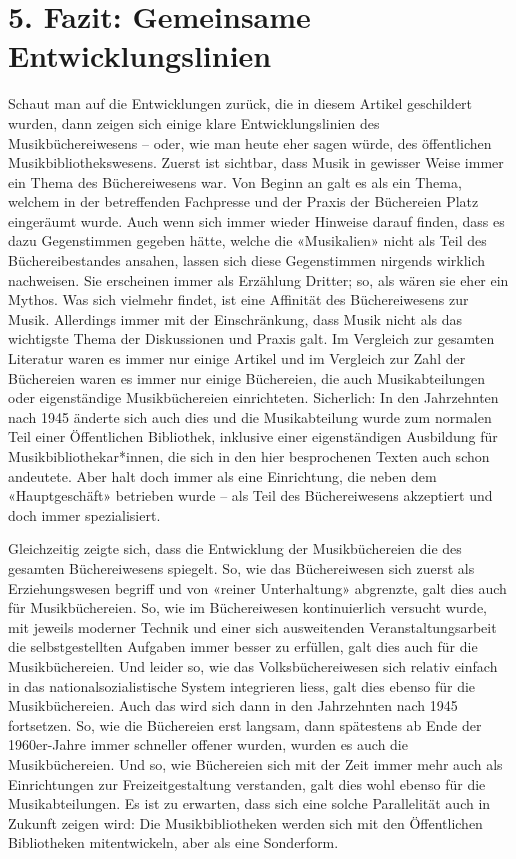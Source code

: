 \documentclass[a4paper,
fontsize=11pt,
oneside,
numbers=noperiodatend,
parskip=half-,
bibliography=totoc,
final
]{scrartcl}
\begin{document}
\hypertarget{fazit-gemeinsame-entwicklungslinien}{%
\section{5. Fazit: Gemeinsame
Entwicklungslinien}\label{fazit-gemeinsame-entwicklungslinien}}

Schaut man auf die Entwicklungen zurück, die in diesem Artikel
geschildert wurden, dann zeigen sich einige klare Entwicklungslinien des
Musikbüchereiwesens -- oder, wie man heute eher sagen würde, des
öffentlichen Musikbibliothekswesens. Zuerst ist sichtbar, dass Musik in
gewisser Weise immer ein Thema des Büchereiwesens war. Von Beginn an
galt es als ein Thema, welchem in der betreffenden Fachpresse und der
Praxis der Büchereien Platz eingeräumt wurde. Auch wenn sich immer
wieder Hinweise darauf finden, dass es dazu Gegenstimmen gegeben hätte,
welche die «Musikalien» nicht als Teil des Büchereibestandes ansahen,
lassen sich diese Gegenstimmen nirgends wirklich nachweisen. Sie
erscheinen immer als Erzählung Dritter; so, als wären sie eher ein
Mythos. Was sich vielmehr findet, ist eine Affinität des Büchereiwesens
zur Musik. Allerdings immer mit der Einschränkung, dass Musik nicht als
das wichtigste Thema der Diskussionen und Praxis galt. Im Vergleich zur
gesamten Literatur waren es immer nur einige Artikel und im Vergleich
zur Zahl der Büchereien waren es immer nur einige Büchereien, die auch
Musikabteilungen oder eigenständige Musikbüchereien einrichteten.
Sicherlich: In den Jahrzehnten nach 1945 änderte sich auch dies und die
Musikabteilung wurde zum normalen Teil einer Öffentlichen Bibliothek,
inklusive einer eigenständigen Ausbildung für Musikbibliothekar*innen,
die sich in den hier besprochenen Texten auch schon andeutete. Aber halt
doch immer als eine Einrichtung, die neben dem «Hauptgeschäft» betrieben
wurde -- als Teil des Büchereiwesens akzeptiert und doch immer
spezialisiert.

Gleichzeitig zeigte sich, dass die Entwicklung der Musikbüchereien die
des gesamten Büchereiwesens spiegelt. So, wie das Büchereiwesen sich
zuerst als Erziehungswesen begriff und von «reiner Unterhaltung»
abgrenzte, galt dies auch für Musikbüchereien. So, wie im Büchereiwesen
kontinuierlich versucht wurde, mit jeweils moderner Technik und einer
sich ausweitenden Veranstaltungsarbeit die selbstgestellten Aufgaben
immer besser zu erfüllen, galt dies auch für die Musikbüchereien. Und
leider so, wie das Volksbüchereiwesen sich relativ einfach in das
nationalsozialistische System integrieren liess, galt dies ebenso für
die Musikbüchereien. Auch das wird sich dann in den Jahrzehnten nach
1945 fortsetzen. So, wie die Büchereien erst langsam, dann spätestens ab
Ende der 1960er-Jahre immer schneller offener wurden, wurden es auch die
Musikbüchereien. Und so, wie Büchereien sich mit der Zeit immer mehr
auch als Einrichtungen zur Freizeitgestaltung verstanden, galt dies wohl
ebenso für die Musikabteilungen. Es ist zu erwarten, dass sich eine
solche Parallelität auch in Zukunft zeigen wird: Die Musikbibliotheken
werden sich mit den Öffentlichen Bibliotheken mitentwickeln, aber als
eine Sonderform.
\end{document}
